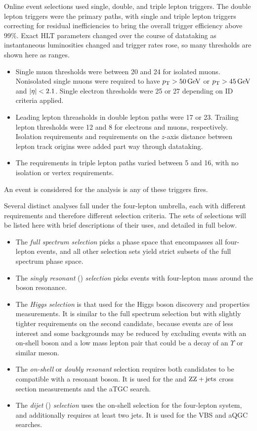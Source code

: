 Online event selections used single, double, and triple lepton triggers.
The double lepton triggers were the primary paths, with single and triple lepton triggers correcting for residual inefficiencies to bring the overall trigger efficiency above 99\%.
Exact HLT parameters changed over the course of datataking as instantaneous luminosities changed and trigger rates rose, so many thresholds are shown here as ranges.
\begin{itemize}
  \item Single muon {\pt} thresholds were between 20 and {24\GeV} for isolated muons.
  Nonisolated single muons were required to have $p_\mathrm{T} > 50\,\mathrm{Ge\hspace{-.08em}V}$ or $p_\mathrm{T} > 45\,\mathrm{Ge\hspace{-.08em}V}$ and $\lvert \eta \rvert < 2.1$.
  Single electron {\pt} thresholds were 25 or {27\GeV} depending on ID criteria applied.
  \item Leading lepton {\pt} threasholds in double lepton paths were 17 or {23\GeV}.
  Trailing lepton thresholds were {12\GeV} and {8\GeV} for electrons and muons, respectively.
  Isolation requirements and requirements on the $z$-axis distance between lepton track origins were added part way through datataking.
  \item The {\pt} requirements in triple lepton paths varied between 5 and {16\GeV}, with no isolation or vertex requirements.
\end{itemize}
An event is considered for the analysis is any of these triggers fires.

Several distinct analyses fall under the four-lepton umbrella, each with different requirements and therefore different selection criteria.
The sets of selections will be listed here with brief descriptions of their uses, and detailed in full below.
\begin{itemize}
  \item The \emph{full spectrum selection} picks a phase space that encompasses all four-lepton events, and all other selection sets yield strict subsets of the full spectrum phase space.
  \item The \emph{singly resonant} ({\Zfourl}) \emph{selection} picks events with four-lepton mass around the {\PZ} boson resonance.
  \item The \emph{Higgs selection} is that used for the Higgs boson discovery and properties measurements.
  It is similar to the full spectrum selection but with slightly tighter requirements on the second {\Zgs} candidate, because {\Zfourl} events are of less interest and some backgrounds may be reduced by excluding events with an on-shell {\PZ} boson and a low mass lepton pair that could be a decay of an {$\Upsilon$} or similar meson.
  \item The \emph{on-shell} or \emph{doubly resonant} selection requires both {\PZ} candidates to be compatible with a resonant {\PZ} boson.
  It is used for the {\ZZ} and $\mathrm{Z}\mathrm{Z} + \text{jets}$ cross section measurements and the aTGC search.
  \item The \emph{dijet} ({\ZZjj}) \emph{selection} uses the on-shell selection for the four-lepton system, and additionally requires at least two jets.
  It is used for the VBS and aQGC searches.
\end{itemize}


